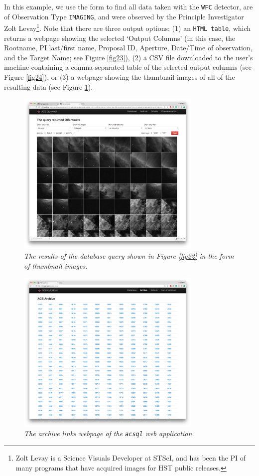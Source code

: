 \documentclass[10pt,journal,compsoc]{IEEEtran}
\begin{document}
In this example, we use the form to find all data taken with the \texttt{WFC} detector, are of Observation Type \texttt{IMAGING}, and were observed by the Principle Investigator
Zolt Levay\footnote{Zolt Levay is a Science Visuals Developer at STScI, and has been the PI of many programs that have acquired images for HST public releases.}.  Note that there are three
output options: (1) an \texttt{HTML table}, which returns a webpage showing the selected `Output Columns' (in this case, the Rootname, PI last/first name, Proposal ID, Aperture, Date/Time of
observation, and the Target Name; see Figure \ref{fig23}), (2) a CSV file downloaded to the user's machine containing a comma-separated table of the selected output columns
(see Figure \ref{fig24}), or (3) a webpage showing the thumbnail images of all of the resulting data (see Figure \ref{fig25}).

\begin{figure}[!t]
\centering
\includegraphics[width=3.5in]{./figures/database_query_results_thumbnails.png}
\caption{\textit{The results of the database query shown in Figure \ref{fig22} in the form of thumbnail images.}}
\label{fig25}
\end{figure}

\begin{figure}[!t]
\centering
\includegraphics[width=3.5in]{./figures/archive_links.png}
\caption{\textit{The archive links webpage of the \texttt{acsql} web application.}}
\label{fig26}
\end{figure}
\end{document}
